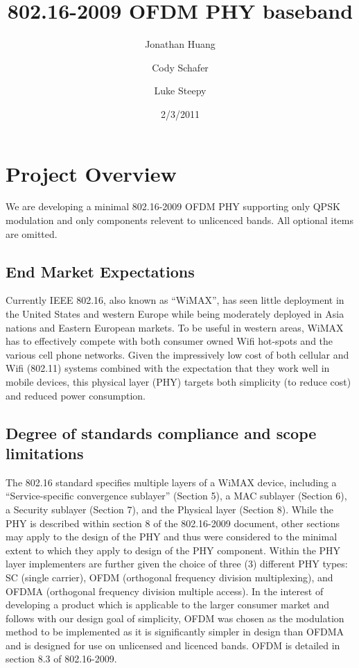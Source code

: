 \documentclass[10pt]{article}
\title{802.16-2009 OFDM PHY baseband}
\author{Jonathan Huang \and Cody Schafer \and Luke Steepy}
\date{2/3/2011}
\begin{document}
\maketitle
\section{Project Overview}
We are developing a minimal 802.16-2009 OFDM PHY supporting only QPSK
modulation and only components relevent to unlicenced bands. All
optional items are omitted.

	\subsection{End Market Expectations}
	Currently IEEE 802.16, also known as ``WiMAX'', has seen little deployment in the
	United States and western Europe while being moderately deployed in Asia
	nations and Eastern European markets. To be useful in western areas, WiMAX has
	to effectively compete with both consumer owned Wifi hot-spots and the various
	cell phone networks. Given the impressively low cost of both cellular and Wifi
	(802.11) systems combined with the expectation that they work well in mobile
	devices, this physical layer (PHY) targets both simplicity (to reduce cost) and
	reduced power consumption.

	\subsection{Degree of standards compliance and scope limitations}
	The 802.16 standard specifies multiple layers of a WiMAX device, including a
	``Service-specific convergence sublayer'' (Section 5), a MAC sublayer (Section
	6), a Security sublayer (Section 7), and the Physical layer (Section 8). While
	the PHY is described within section 8 of the 802.16-2009 document, other
	sections may apply to the design of the PHY and thus were considered to the
	minimal extent to which they apply to design of the PHY component.  Within the
	PHY layer implementers are further given the choice of three (3) different PHY
	types: SC (single carrier), OFDM (orthogonal frequency division multiplexing),
	and OFDMA (orthogonal frequency division multiple access). In the interest of
	developing a product which is applicable to the larger consumer market and
	follows with our design goal of simplicity, OFDM was chosen as the modulation
	method to be implemented as it is significantly simpler in design than OFDMA
	and is designed for use on unlicensed and licenced bands. OFDM is detailed in
	section 8.3 of 802.16-2009.
\end{document}
